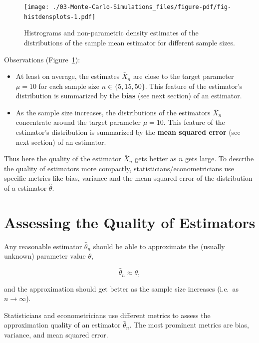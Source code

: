 \documentclass[
  letterpaper,
  DIV=11,
  numbers=noendperiod]{scrreprt}
\theoremstyle{definition}
\theoremstyle{plain}
\theoremstyle{plain}
\theoremstyle{remark}
\begin{document}
\begin{figure}[H]

{\centering \texttt{[image: ./03-Monte-Carlo-Simulations\_files/figure-pdf/fig-histdensplots-1.pdf]}

}

\caption{\label{fig-histdensplots}Histrograms and non-parametric density
estimates of the distributions of the sample mean estimator for
different sample sizes.}

\end{figure}

Observations (Figure~\ref{fig-histdensplots}):

\begin{itemize}
\item
  At least on average, the estimates \(\bar{X}_n\) are close to the
  target parameter \(\mu=10\) for each sample size \(n\in\{5,15,50\}\).
  This feature of the estimator's distribution is summarized by the
  \textbf{bias} (see next section) of an estimator.
\item
  As the sample size increases, the distributions of the estimators
  \(\bar{X}_n\) concentrate around the target parameter \(\mu=10\). This
  feature of the estimator's distribution is summarized by the
  \textbf{mean squared error} (see next section) of an estimator.
\end{itemize}

Thus here the quality of the estimator \(\bar{X}_n\) gets better as
\(n\) gets large. To describe the quality of estimators more compactly,
statisticians/econometricians use specific metrics like bias, variance
and the mean squared error of the distribution of a estimator
\(\hat\theta\).

\hypertarget{assessing-the-quality-of-estimators}{%
\section{Assessing the Quality of
Estimators}\label{assessing-the-quality-of-estimators}}

Any reasonable estimator \(\hat\theta_n\) should be able to approximate
the (usually unknown) parameter value \(\theta\),

\[
\hat\theta_n\approx\theta,
\]

and the approximation should get better as the sample size increases
(i.e.~as \(n\to\infty\)).

Statisticians and econometricians use different metrics to assess the
approximation quality of an estimator \(\hat\theta_n\). The most
prominent metrics are bias, variance, and mean squared error.
\end{document}

